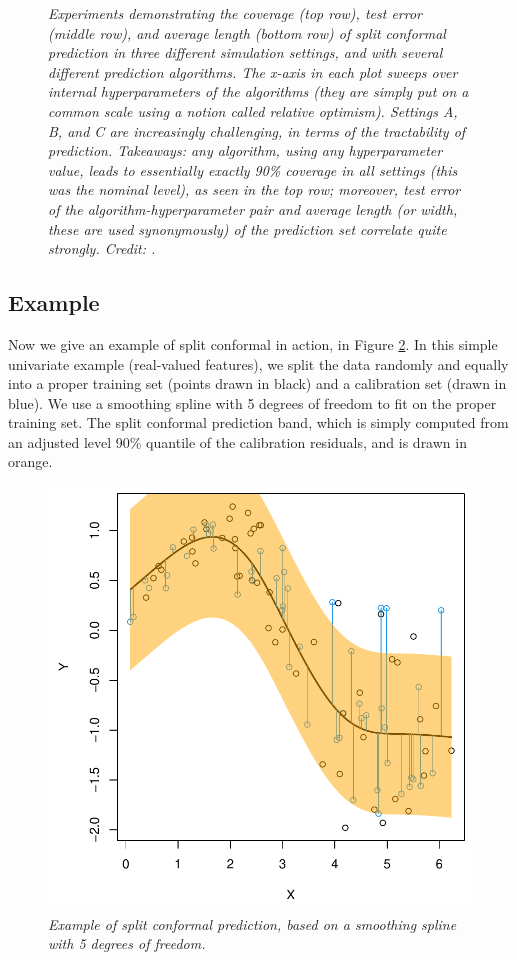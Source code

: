 \documentclass{article}
\begin{document}
\begin{figure}[p]
\caption{\it Experiments demonstrating the coverage (top row), test error
  (middle row), and average length (bottom row) of split conformal prediction in
  three different simulation settings, and with several different prediction 
  algorithms. The x-axis in each plot sweeps over internal hyperparameters of 
  the algorithms (they are simply put on a common scale using a notion called
  relative optimism). Settings A, B, and C are increasingly challenging, in
  terms of the tractability of prediction. Takeaways: any algorithm, using any 
  hyperparameter value, leads to essentially exactly 90\% coverage in all
  settings (this was the nominal level), as seen in the top row; moreover, test 
  error of the algorithm-hyperparameter pair and average length (or width, these
  are used synonymously) of the prediction set correlate quite strongly. Credit:
  \citet{lei2018distribution}.}       
\label{fig:experiments}
\end{figure}

\subsection{Example}

Now we give an example of split conformal in action, in Figure
\ref{fig:split}. In this simple univariate example (real-valued features), we
split the data randomly and equally into a proper training set (points drawn in
black) and a calibration set (drawn in blue). We use a smoothing spline with 5
degrees of freedom to fit  on the proper training set. The
split conformal prediction band, which is simply computed from an adjusted 
level 90\% quantile of the calibration residuals, and is drawn in orange. 

\begin{figure}
\centering
\includegraphics[height=0.33\textheight]{split.pdf}
\caption{\it Example of split conformal prediction, based on a smoothing spline
  with 5 degrees of freedom.} 
\label{fig:split}
\end{figure}
\end{document}
